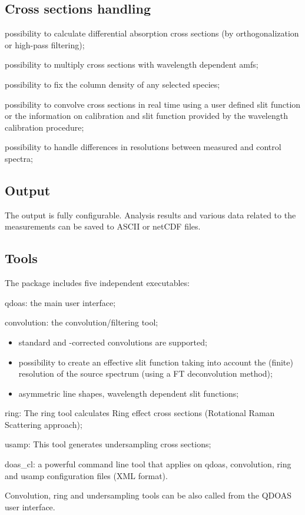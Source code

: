 \subsection{Cross sections handling}
\begin{qdoasitem}
\item possibility to calculate differential absorption cross sections (by orthogonalization or high-pass filtering);
\item possibility to multiply cross sections with wavelength dependent \glspl{amf};
\item possibility to fix the column density of any selected species;
\item possibility to convolve cross sections in real time using a user defined slit function or the information on calibration and slit function provided by the wavelength calibration procedure;
\item possibility to handle differences in resolutions between measured and control spectra;
\end{qdoasitem}

\subsection{Output}
The output is fully configurable. Analysis results and various data related to the measurements can be saved to ASCII or netCDF files.

\subsection{Tools}

The package includes five independent executables:

\begin{qdoasitem}
  \item qdoas: the main user interface;
  \item convolution: the convolution/filtering tool;
    \begin{itemize} \itemsep -2pt
    \item standard and -corrected convolutions are supported;
    \item possibility to create an effective slit function taking into account the (finite) resolution of the source spectrum (using a FT deconvolution method);
    \item asymmetric line shapes, wavelength dependent slit functions;
    \end{itemize}

  \item ring: The ring tool calculates Ring effect cross sections (Rotational Raman Scattering approach);
  \item usamp: This tool generates undersampling cross sections;
  \item doas\_cl: a powerful command line tool that applies on qdoas, convolution, ring and usamp configuration files (XML format).
  \end{qdoasitem}
Convolution, ring and undersampling tools can be also called from the QDOAS user interface.


